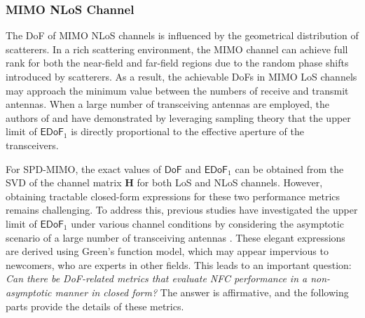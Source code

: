 \documentclass[journal]{IEEEtran}
\theoremstyle{definition}
\begin{document}
\subsubsection{MIMO NLoS Channel}
The DoF of MIMO NLoS channels is influenced by the geometrical distribution of scatterers. In a rich scattering environment, the MIMO channel can achieve full rank for both the near-field and far-field regions due to the random phase shifts introduced by scatterers. As a result, the achievable DoFs in MIMO LoS channels may approach the minimum value between the numbers of receive and transmit antennas. When a large number of transceiving antennas are employed, the authors of \cite{Poon2005} and \cite{Pizzo2023} have demonstrated by leveraging sampling theory that the upper limit of ${\mathsf{EDoF}}_1$ is directly proportional to the effective aperture of the transceivers.

For SPD-MIMO, the exact values of $\mathsf{DoF}$ and ${\mathsf{EDoF}}_1$ can be obtained from the SVD of the channel matrix $\mathbf{H}$ for both LoS and NLoS channels. However, obtaining tractable closed-form expressions for these two performance metrics remains challenging. To address this, previous studies have investigated the upper limit of ${\mathsf{EDoF}}_1$ under various channel conditions by considering the asymptotic scenario of a large number of transceiving antennas \cite{Dardari2020,Pizzo2023,Poon2005,Miller2000}. These elegant expressions are derived using Green's function model, which may appear impervious to newcomers, who are experts in other fields. This leads to an important question: \emph{Can there be DoF-related metrics that evaluate NFC performance in a non-asymptotic manner in closed form?} The answer is affirmative, and the following parts provide the details of these metrics.
\end{document}
